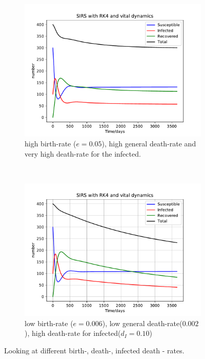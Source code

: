 \begin{figure}[H]
\begin{subfigure}{0.49\textwidth}
    \end{subfigure}
     ~ 
    \begin{subfigure}{0.49\textwidth}
         \centering
         \includegraphics[width=\linewidth]{../fig/newfig/RK4_vitalDynamics_d01_dI30_e05.pdf}
         \caption{high birth-rate ($e=0.05$), high general death-rate and very high death-rate for the infected.}
    \end{subfigure}
     ~ 
    \begin{subfigure}{0.49\textwidth}
         \centering
         \includegraphics[width=\linewidth]{../fig/newfig/RK4_vitalDynamics_d002_dI10_e006.pdf}
         \caption{low birth-rate ($e=0.006$), low general death-rate($0.002$), high death-rate for infected($d_I = 0.10$)}
    \end{subfigure}
    \caption{Looking at different birth-, death-, infected death - rates.}
    \label{fig:RK4VD1}
\end{figure}


